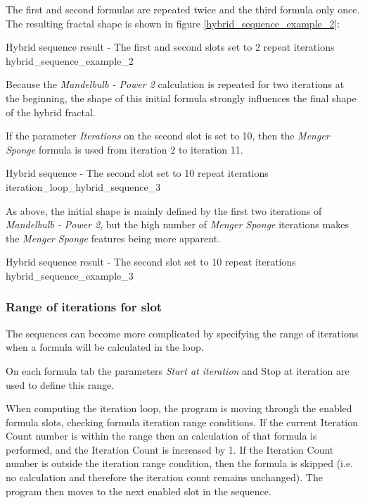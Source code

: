 The first and second formulas are repeated twice and the third formula only once.
The resulting fractal shape is shown in figure \ref{hybrid_sequence_example_2}:

{Hybrid sequence result - The first and second slots set to 2 repeat iterations}
{hybrid_sequence_example_2}

Because the \emph{Mandelbulb - Power 2} calculation is repeated for two iterations at the beginning, the shape of this initial formula strongly influences the final shape of the hybrid fractal.

If the parameter \emph{Iterations} on the second slot is set to 10,
then the \emph{Menger Sponge} formula is used from iteration 2 to iteration 11.

{Hybrid sequence - The second slot set to 10 repeat iterations}
{iteration_loop_hybrid_sequence_3}

As above, the initial shape is mainly defined by the first two iterations of \emph{Mandelbulb - Power 2},
but the high number of \emph{Menger Sponge} iterations makes the \emph{Menger Sponge} features being more apparent.

{Hybrid sequence result - The second slot set to 10 repeat iterations}
{hybrid_sequence_example_3}

\subsubsection{Range of iterations for slot}

The sequences can become more complicated by specifying the range of iterations when a formula will be calculated in the loop.

On each formula tab the parameters \emph{Start at iteration} and {Stop at iteration} are used to define this range.

When computing the iteration loop, the program is moving through the enabled formula slots, checking formula iteration range conditions. If the current Iteration Count number is within the range then an calculation of that formula is performed, and the Iteration Count is increased by 1. If the Iteration Count number is outside the iteration range condition, then the formula is skipped (i.e. no calculation and therefore the iteration count remains unchanged). The program then moves to the next enabled slot in the sequence.

